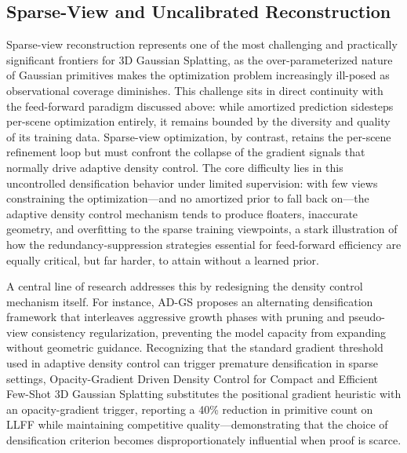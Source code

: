 \documentclass[11pt,a4paper]{article}
\begin{document}
\subsection{Sparse-View and Uncalibrated Reconstruction}


Sparse-view reconstruction represents one of the most challenging and practically significant frontiers for 3D Gaussian Splatting, as the over-parameterized nature of Gaussian primitives makes the optimization problem increasingly ill-posed as observational coverage diminishes. This challenge sits in direct continuity with the feed-forward paradigm discussed above: while amortized prediction sidesteps per-scene optimization entirely, it remains bounded by the diversity and quality of its training data. Sparse-view optimization, by contrast, retains the per-scene refinement loop but must confront the collapse of the gradient signals that normally drive adaptive density control. The core difficulty lies in this uncontrolled densification behavior under limited supervision: with few views constraining the optimization---and no amortized prior to fall back on---the adaptive density control mechanism tends to produce floaters, inaccurate geometry, and overfitting to the sparse training viewpoints, a stark illustration of how the redundancy-suppression strategies essential for feed-forward efficiency are equally critical, but far harder, to attain without a learned prior.  

A central line of research addresses this by redesigning the density control mechanism itself. For instance, AD-GS \cite{arxiv:2509.11003v2} proposes an alternating densification framework that interleaves aggressive growth phases with pruning and pseudo-view consistency regularization, preventing the model capacity from expanding without geometric guidance. Recognizing that the standard gradient threshold used in adaptive density control can trigger premature densification in sparse settings, Opacity-Gradient Driven Density Control for Compact and Efficient Few-Shot 3D Gaussian Splatting substitutes the positional gradient heuristic with an opacity-gradient trigger, reporting a 40\% reduction in primitive count on LLFF while maintaining competitive quality---demonstrating that the choice of densification criterion becomes disproportionately influential when proof is scarce.  
\end{document}
